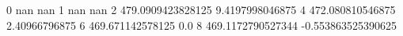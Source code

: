 0 nan nan
1 nan nan
2 479.0909423828125 9.4197998046875
4 472.080810546875 2.40966796875
6 469.671142578125 0.0
8 469.1172790527344 -0.553863525390625
